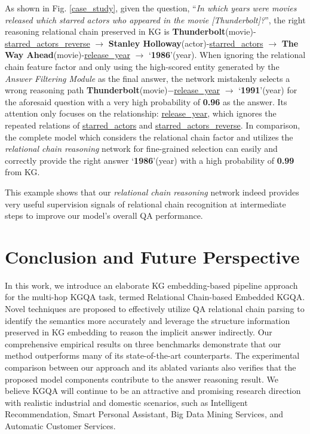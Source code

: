 \documentclass[pdflatex,sn-mathphys]{sn-jnl}%
\theoremstyle{thmstyleone}%
\theoremstyle{thmstyletwo}%
\theoremstyle{thmstylethree}%
\begin{document}
As shown in Fig. \ref{case_study}, 
given the question, ``\textit{In which years were movies released which starred actors who appeared in the movie [Thunderbolt]?}'', the right reasoning relational chain preserved in KG is \textbf{Thunderbolt}(movie)-\underline{starred\_actors\_reverse} $\rightarrow$ \textbf{Stanley Holloway}(actor)-\underline{starred\_actors} $\rightarrow$ \textbf{The Way Ahead}(movie)-\underline{release\_year} $\rightarrow$ `\textbf{1986}'(year). When ignoring the relational chain feature factor and only using the high-scored entity generated by the \textit{Answer Filtering Module} as the final answer, the network mistakenly selects a wrong reasoning path \textbf{Thunderbolt}(movie)$-$\underline{release\_year} $\rightarrow$ `\textbf{1991}'(year) for the aforesaid question with a very high probability of \textbf{0.96} as the answer. Its attention only focuses on the relationship: \underline{release\_year}, which ignores the repeated relations of \underline{starred\_actors} and \underline{starred\_actors\_reverse}. In comparison, the complete model which considers the relational chain factor and utilizes the \textit{relational chain reasoning} network for fine-grained selection can easily and correctly provide the right answer `\textbf{1986}'(year) with a high probability of \textbf{0.99} from KG.

This example shows that our \textit{relational chain reasoning} network indeed provides very useful supervision signals of relational chain recognition at intermediate steps to improve our model's overall QA performance.
\label{casestudy}

\section{Conclusion and Future Perspective}
\label{conclusion}
In this work, we introduce an elaborate KG embedding-based pipeline approach for the multi-hop KGQA task, termed Relational Chain-based Embedded KGQA. Novel techniques are proposed to effectively utilize QA relational chain parsing to identify the semantics more accurately and leverage the structure information preserved in KG embedding to reason the implicit answer indirectly.
Our comprehensive empirical results on three benchmarks demonstrate that our method outperforms many of its state-of-the-art counterparts. The experimental comparison between our approach and its ablated variants also verifies that the proposed model components contribute to the answer reasoning result.
We believe KGQA will continue to be an attractive and promising research direction with realistic industrial and domestic scenarios, such as Intelligent Recommendation, Smart Personal Assistant, Big Data Mining Services, and Automatic Customer Services.
\end{document}
